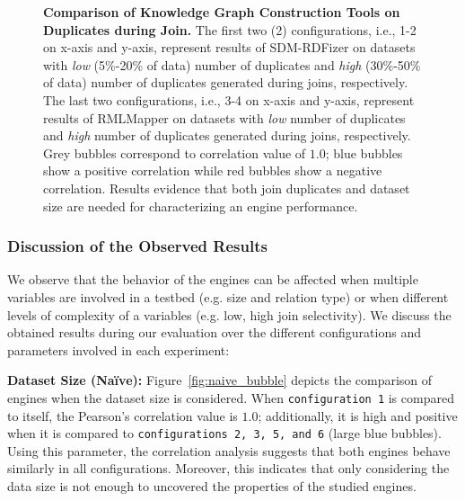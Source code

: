 \begin{figure}[!tb]
{      \label{fig:naive2}
    }
    \caption[Knowledge Graph Construction Tools on Duplicates during Join]{\textbf{Comparison of Knowledge Graph Construction Tools on Duplicates during Join.} The first two (2) configurations, i.e., 1-2 on x-axis and y-axis, represent results of SDM-RDFizer on datasets with \textit{low} (5\%-20\% of data) number of duplicates and \textit{high} (30\%-50\% of data) number of duplicates generated during joins, respectively. The last two configurations, i.e., 3-4 on x-axis and y-axis, represent results of RMLMapper on datasets with \textit{low} number of duplicates and \textit{high} number of duplicates generated during joins, respectively. Grey bubbles correspond to correlation value of $1.0$; blue bubbles show a positive correlation while red bubbles show a negative correlation. Results evidence that both join duplicates and dataset size are needed for characterizing an engine performance.}
    \label{fig:duplicates_bubble}
\end{figure}

\subsubsection*{Discussion of the Observed Results}
We observe that the behavior of the engines can be affected when multiple variables are involved in a testbed (e.g. size and relation type) or when different levels of complexity of a variables (e.g. low, high join selectivity). We discuss the obtained results during our evaluation over the different configurations and parameters involved in each experiment:   

\noindent \textbf{Dataset Size (Na{\"i}ve):}
Figure~\ref{fig:naive_bubble} depicts the comparison of engines when the dataset size is considered. When \texttt{configuration 1} is compared to itself, the Pearson's correlation value is $1.0$; additionally, it is high and positive when it is compared to \texttt{configurations 2, 3, 5, and 6} (large blue bubbles). 
Using this parameter, the correlation analysis suggests that both engines behave similarly in all configurations. Moreover, this indicates that only considering the data size is not enough to uncovered the properties of the studied engines.





